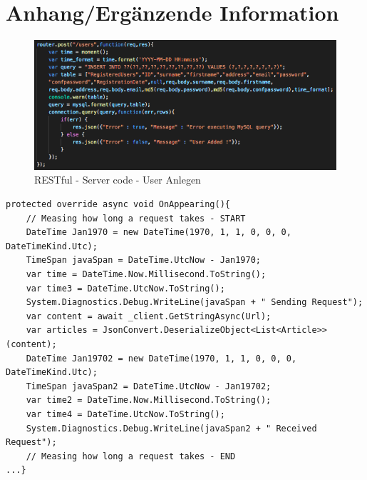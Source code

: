%
%
% 
% 
\renewcommand*{\lstlistlistingname}{Codeverzeichnis}
\chapter{Anhang/Ergänzende Information}
\label{chap:app}
	\begin{figure}[h!]
		\centering
		\includegraphics[width=1\textwidth]{images/restfull-server-code.png}
		\caption{RESTful - Server code - User Anlegen}
		\label{fig:serversidecode}
	\end{figure}

	\begin{lstlisting}[caption={Messung der Kommunikationszeit - MCKB PCL},label={lst:measurecom},captionpos=b,style=csharp]
protected override async void OnAppearing(){
    // Measing how long a request takes - START
    DateTime Jan1970 = new DateTime(1970, 1, 1, 0, 0, 0, DateTimeKind.Utc);
    TimeSpan javaSpan = DateTime.UtcNow - Jan1970;
    var time = DateTime.Now.Millisecond.ToString();
    var time3 = DateTime.UtcNow.ToString();
    System.Diagnostics.Debug.WriteLine(javaSpan + " Sending Request");
    var content = await _client.GetStringAsync(Url);
    var articles = JsonConvert.DeserializeObject<List<Article>>(content);
    DateTime Jan19702 = new DateTime(1970, 1, 1, 0, 0, 0, DateTimeKind.Utc);
    TimeSpan javaSpan2 = DateTime.UtcNow - Jan19702;
    var time2 = DateTime.Now.Millisecond.ToString();
    var time4 = DateTime.UtcNow.ToString();
    System.Diagnostics.Debug.WriteLine(javaSpan2 + " Received Request");
    // Measing how long a request takes - END
...}
	\end{lstlisting}

